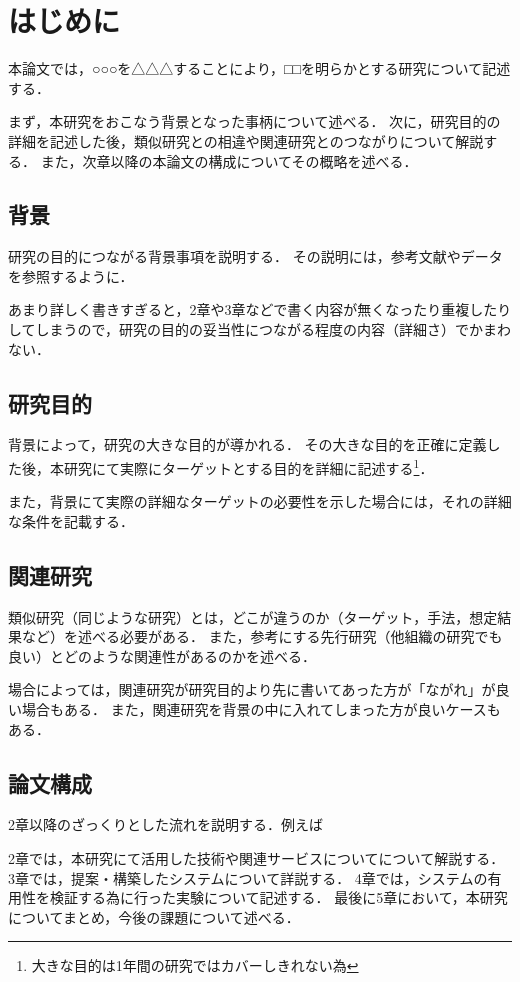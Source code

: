 \chapter{はじめに}
本論文では，○○○を△△△することにより，□□を明らかとする研究について記述する．

まず，本研究をおこなう背景となった事柄について述べる．
次に，研究目的の詳細を記述した後，類似研究との相違や関連研究とのつながりについて解説する．
また，次章以降の本論文の構成についてその概略を述べる．

\section{背景}
研究の目的につながる背景事項を説明する．
その説明には，参考文献やデータを参照するように．

あまり詳しく書きすぎると，2章や3章などで書く内容が無くなったり重複したりしてしまうので，研究の目的の妥当性につながる程度の内容（詳細さ）でかまわない．

\section{研究目的}
背景によって，研究の大きな目的が導かれる．
その大きな目的を正確に定義した後，本研究にて実際にターゲットとする目的を詳細に記述する\footnote{大きな目的は1年間の研究ではカバーしきれない為}．

また，背景にて実際の詳細なターゲットの必要性を示した場合には，それの詳細な条件を記載する．

\section{関連研究}
類似研究（同じような研究）とは，どこが違うのか（ターゲット，手法，想定結果など）を述べる必要がある．
また，参考にする先行研究（他組織の研究でも良い）とどのような関連性があるのかを述べる．

場合によっては，関連研究が研究目的より先に書いてあった方が「ながれ」が良い場合もある．
また，関連研究を背景の中に入れてしまった方が良いケースもある．

\section{論文構成}
2章以降のざっくりとした流れを説明する．例えば

2章では，本研究にて活用した技術や関連サービスについてについて解説する．
3章では，提案・構築したシステムについて詳説する．
4章では，システムの有用性を検証する為に行った実験について記述する．
最後に5章において，本研究についてまとめ，今後の課題について述べる．


